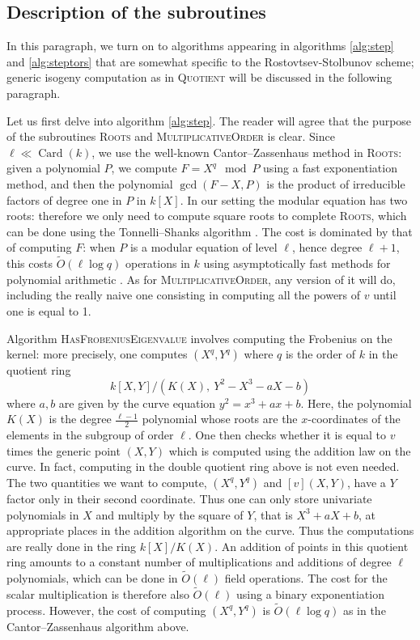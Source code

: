 \documentclass{article}
\newcommand{\softO}{\tilde{O}}
\newcommand{\algstyle}[1]{\textsc{#1}}
\renewcommand{\v}{\vspace{5mm}}
\theoremstyle{definition}
\DeclareMathOperator{\Card}{Card}
\begin{document}
\subsection{Description of the subroutines}

In this paragraph, we turn on to algorithms appearing in algorithms \ref{alg:step}
and \ref{alg:steptors} that are somewhat specific to the Rostovtsev-Stolbunov
scheme; generic isogeny computation as in \algstyle{Quotient} will be discussed
in the following paragraph.
\v

Let us first delve into algorithm \ref{alg:step}.
The reader will agree that the purpose of the subroutines \algstyle{Roots}
and \algstyle{MultiplicativeOrder} is clear. Since $\ell\ll\Card(k)$,
we use the well-known Cantor--Zassenhaus method \cite{} in \algstyle{Roots}:
given a polynomial $P$,
we compute $F = X^q \mod P$ using a fast exponentiation method, and then the polynomial
$\gcd(F - X, P)$ is the product of irreducible factors of degree one in $P$
in $k[X]$. In our setting the modular equation has two roots: therefore we only need
to compute square roots to complete \algstyle{Roots}, which can be
done using the Tonnelli--Shanks algorithm \cite{}. The cost is dominated
by that of computing $F$: when $P$ is a modular equation
of level $\ell$, hence degree $\ell + 1$, this costs $\softO(\ell\log q)$ operations in $k$
using asymptotically fast methods for polynomial arithmetic \cite{}.
As for \algstyle{MultiplicativeOrder},
any version of it will do, including the really naive one consisting in computing
all the powers of $v$ until one is equal to 1.

Algorithm \algstyle{HasFrobeniusEigenvalue}
involves computing the Frobenius on the kernel: more precisely, one computes $(X^q, Y^q)$
where $q$ is the order of $k$ in the quotient ring
\[
k[X, Y]/(K(X),\ Y^2 - X^3 - aX - b)
\]
where $a, b$ are given by the curve equation $y^2 = x^3 + ax + b$. Here, the polynomial
$K(X)$ is the degree $\frac{\ell-1}{2}$ polynomial whose roots are the $x$-coordinates of the elements
in the subgroup of order $\ell$. One then checks whether it is equal to $v$ times the generic
point $(X, Y)$ which is computed using the addition law on the curve. In fact, computing
in the double quotient ring above is not even needed. The two quantities we want to compute,
$(X^q, Y^q)$ and $[v](X, Y)$, have a $Y$ factor only in their second coordinate. Thus one
can only store univariate polynomials in $X$ and multiply by the square of $Y$, that is
$X^3 + aX + b$, at appropriate places in the addition algorithm on the curve. Thus the
computations are really done in the ring $k[X]/K(X)$. An addition of points in this
quotient ring amounts to a constant number of multiplications and additions of degree $\ell$
polynomials, which can be done in $\softO(\ell)$ field operations.
The cost for the scalar multiplication is therefore also
$\softO(\ell)$ using a binary exponentiation process. However, the cost of computing
$(X^q, Y^q)$ is $\softO(\ell\log q)$ as in the Cantor--Zassenhaus algorithm above.
\end{document}
